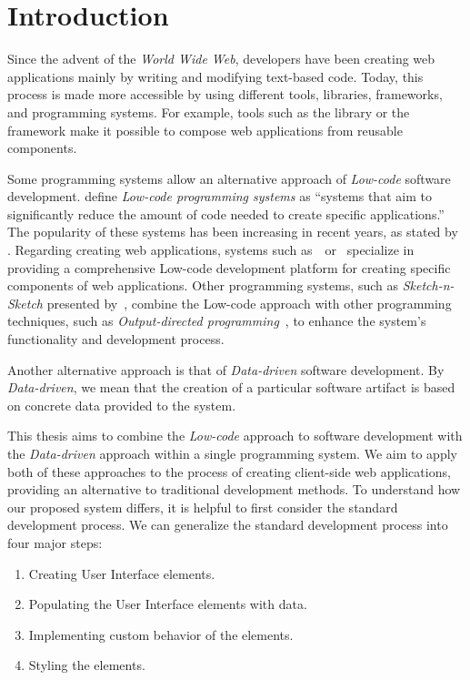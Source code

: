 \chapter*{Introduction}

Since the advent of the \emph{World Wide Web}, developers have been creating web applications mainly by writing and modifying text-based code.
Today, this process is made more accessible by using different tools, libraries, frameworks, and programming systems.
For example, tools such as the \citet{react} library or the \citet{vuejs} framework make it possible to compose web applications from reusable components.

Some programming systems allow an alternative approach of \emph{Low-code} software development.
\citet{Pinho_Aguiar_Amaral_2023} define \emph{Low-code programming systems} as ``systems that aim to significantly reduce the amount of code needed to create specific applications.''
The popularity of these systems has been increasing in recent years, as stated by \citet{Sahay_Indamutsa_Di}.
Regarding creating web applications, systems such as~\citet{mendix}~or~\citet{darklang} specialize in providing a comprehensive Low-code development platform for creating specific components of web applications.
Other programming systems, such as \emph{Sketch-n-Sketch} presented by~\citet{sketch-and-sketch}, combine the Low-code approach
with other programming techniques, such as \emph{Output-directed programming}~\cite{output-directed-programming}, to enhance the system's functionality and development process.

Another alternative approach is that of \emph{Data-driven} software development.
By \emph{Data-driven}, we mean that the creation of a particular software artifact is based on concrete data provided to the system.

This thesis aims to combine the \emph{Low-code} approach to software development with the \emph{Data-driven} approach within a single programming system.
We aim to apply both of these approaches to the process of creating client-side web applications, providing an alternative to traditional development methods.
To understand how our proposed system differs, it is helpful to first consider the standard development process.
We can generalize the standard development process into four major steps:
\begin{enumerate}
	\item Creating User Interface elements.
	\item Populating the User Interface elements with data.
	\item Implementing custom behavior of the elements.
	\item Styling the elements.
\end{enumerate}

